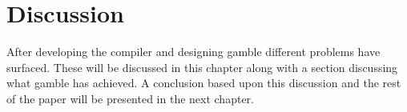 \chapter{Discussion}
After developing the compiler and designing \gls{gamble} different problems have surfaced.
These will be discussed in this chapter along with a section discussing what \gls{gamble} has achieved.
A conclusion based upon this discussion and the rest of the paper will be presented in the next chapter.


